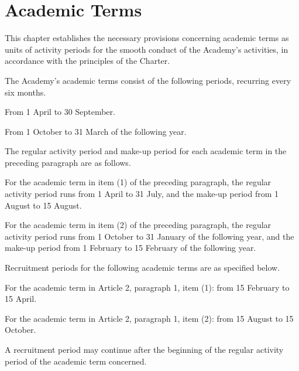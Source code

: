 \newpage
\chapter{Academic Terms}
\begin{articles}
  \item This chapter establishes the necessary provisions concerning academic terms as units of activity periods for the smooth conduct of the Academy's activities, in accordance with the principles of the Charter.
  \item The Academy's academic terms consist of the following periods, recurring every six months.
  \begin{subitems}
    \item From 1 April to 30 September.
    \item From 1 October to 31 March of the following year.
  \end{subitems}
  \begin{paragraphs}
    \item The regular activity period and make-up period for each academic term in the preceding paragraph are as follows.
    \begin{subitems}
      \item For the academic term in item (1) of the preceding paragraph, the regular activity period runs from 1 April to 31 July, and the make-up period from 1 August to 15 August.
      \item For the academic term in item (2) of the preceding paragraph, the regular activity period runs from 1 October to 31 January of the following year, and the make-up period from 1 February to 15 February of the following year.
    \end{subitems}
  \end{paragraphs}
  \item Recruitment periods for the following academic terms are as specified below.
  \begin{subitems}
    \item For the academic term in Article 2, paragraph 1, item (1): from 15 February to 15 April.
    \item For the academic term in Article 2, paragraph 1, item (2): from 15 August to 15 October.
  \end{subitems}
  \begin{paragraphs}
    \item A recruitment period may continue after the beginning of the regular activity period of the academic term concerned.
  \end{paragraphs}

\end{articles}
